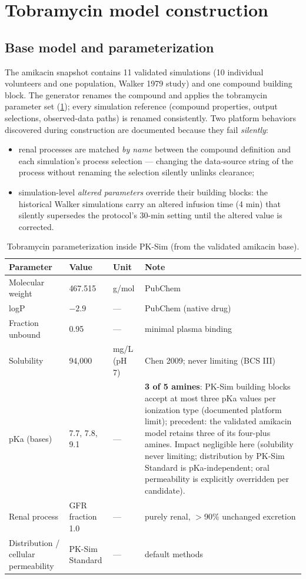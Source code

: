 \section{Tobramycin model construction}
\label{sec:pksim-model}

\subsection{Base model and parameterization}
The amikacin snapshot contains 11 validated simulations (10 individual volunteers and one population, Walker 1979 study) and one compound building block. The generator renames the compound and applies the tobramycin parameter set (\cref{tab:pksim-params}); every simulation reference (compound properties, output selections, observed-data paths) is renamed consistently. Two platform behaviors discovered during construction are documented because they fail \emph{silently}:

\begin{itemize}
\item renal processes are matched \emph{by name} between the compound definition and each simulation's process selection --- changing the data-source string of the process without renaming the selection silently unlinks clearance;
\item simulation-level \emph{altered parameters} override their building blocks: the historical Walker simulations carry an altered infusion time (4 min) that silently supersedes the protocol's 30-min setting until the altered value is corrected.
\end{itemize}

\begin{table}[htbp]
\centering
\caption{Tobramycin parameterization inside PK-Sim (from the validated amikacin base).}
\label{tab:pksim-params}
\small
\footnotesize\setlength{\tabcolsep}{3.5pt}
\begin{tabular}{lllp{4.9cm}}
\toprule
Parameter & Value & Unit & Note \\
\midrule
Molecular weight & 467.515 & g/mol & PubChem \\
logP & $-2.9$ & --- & PubChem (native drug) \\
Fraction unbound & 0.95 & --- & minimal plasma binding \\
Solubility & 94,000 & mg/L (pH 7) & Chen 2009; never limiting (BCS III) \\
pKa (bases) & 7.7, 7.8, 9.1 & --- & \textbf{3 of 5 amines}: PK-Sim building blocks accept at most three pKa values per ionization type (documented platform limit); precedent: the validated amikacin model retains three of its four-plus amines. Impact negligible here (solubility never limiting; distribution by PK-Sim Standard is pKa-independent; oral permeability is explicitly overridden per candidate). \\
Renal process & GFR fraction 1.0 & --- & purely renal, $>$90\% unchanged excretion \\
Distribution / cellular permeability & PK-Sim Standard & --- & default methods \\
\bottomrule
\end{tabular}
\end{table}

